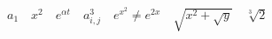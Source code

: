 \documentclass{article}
\begin{document}
\begin{CJK*}{GBK}{song}
\begin{math}
a_1\quad x^2\quad e^{\alpha t}\quad a_{i,j}^3\quad e^{x^2}\ne e^{2x}\quad \sqrt{x^2+\sqrt{y}}\quad \sqrt[3]{2}
\end{math}
\end{CJK*}
\end{document}
